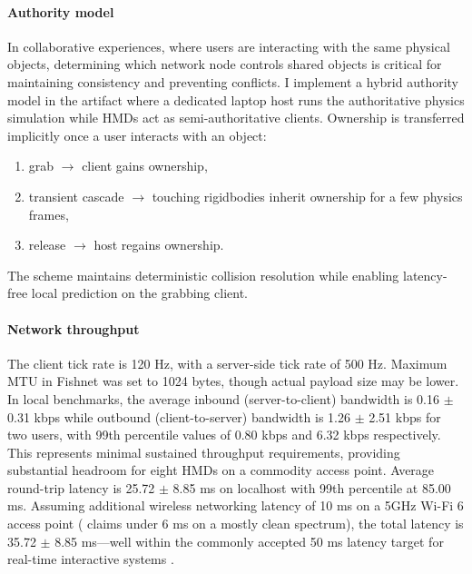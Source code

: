 \paragraph{Authority model}
In collaborative experiences, where users are interacting with the same physical objects, determining which network node controls shared objects is critical for maintaining consistency and preventing conflicts. I implement a hybrid authority model in the artifact where a dedicated laptop host runs the authoritative physics simulation while HMDs act as semi-authoritative clients. Ownership is transferred implicitly once a user interacts with an object:

\begin{enumerate}
  \item grab $\rightarrow$ client gains ownership,
  \item transient cascade $\rightarrow$ touching rigidbodies inherit ownership for a few physics frames,
  \item release $\rightarrow$ host regains ownership.
\end{enumerate}

The scheme maintains deterministic collision resolution while enabling latency-free local prediction on the grabbing client.

\paragraph{Network throughput}
The client tick rate is 120 Hz, with a server-side tick rate of 500 Hz. Maximum MTU in Fishnet was set to 1024 bytes, though actual payload size may be lower.
In local benchmarks, the average inbound (server-to-client) bandwidth is 0.16 $\pm$ 0.31 kbps while outbound (client-to-server) bandwidth is 1.26 $\pm$ 2.51 kbps for two users, with 99th percentile values of 0.80 kbps and 6.32 kbps respectively. This represents minimal sustained throughput requirements, providing substantial headroom for eight HMDs on a commodity access point. Average round-trip latency is 25.72 $\pm$ 8.85 ms on localhost with 99th percentile at 85.00 ms. Assuming additional wireless networking latency of 10 ms on a 5GHz Wi-Fi 6 access point (\cite{liu2023wifi} claims under 6 ms on a mostly clean spectrum), the total latency is 35.72 $\pm$ 8.85 ms—well within the commonly accepted 50 ms latency target for real-time interactive systems \cite{sonkoly2024edge}.

